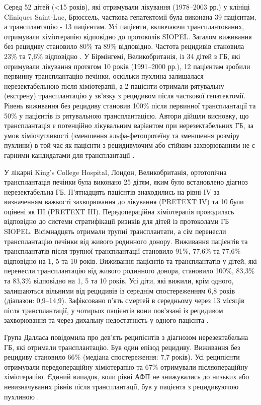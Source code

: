 Серед 52 дітей (<15 років), які отримували лікування (1978–2003 рр.) у клініці Cliniques Saint-Luc, Брюссель, часткова гепатектомії була виконана 39 пацієнтам, а трансплантацію - 13 пацієнтам. Усі пацієнти, включаючи трансплантованих, отримували хіміотерапію відповідно до протоколів SIOPEL. Загалом виживання без рецидиву становило 80\% та 89\% відповідно. Частота рецидивів становила 23\% та 7,6\% відповідно \cite{pmid20406943}.
У Бірмінгемі, Великобританія, із 34 дітей з ГБ, які отримували лікування протягом 10 років (1991–2000 рр.), 12 пацієнтам зробили первинну трансплантацію печінки, оскільки пухлина залишалася нерезектабельною після хіміотерапії, а 2 пацієнти отримали рятувальну (екстрену) трансплантацію у зв’язку з  рецидивом після часткової гепатектомії. Рівень виживання без рецидиву становив 100\% після первинної трансплантації та 50\% у пацієнтів із рятувальною трансплантацією. Автори дійшли висновку, що трансплантація є потенційно лікувальним варіантом при нерезектабельних ГБ, за умов хіміочутливості (зменшення альфа-фетопротеїну та зменшення розміру пухлини) в той час як пацієнти з рецидивуючим або стійким захворюванням не є гарними кандидатами для трансплантації \cite{pmid20070564}.

У лікарні King’s College Hospital, Лондон, Великобританія, ортотопічна трансплантація печінки була виконано 25 дітям, яким було встановлено діагноз нерезектабельна ГБ. П'ятнадцять пацієнтів знаходились на рівні IV за визначенням важкості захворювання до лікування (PRETEXT IV) та 10 були оцінені як III (PRETEXT III). Передопераційна хіміотерапія проводилась відповідно до системи стратифікації ризиків для дітей із протоколами ГБ SIOPEL. Вісімнадцять отримали трупні трансплантати, а сім перенесли трансплантацію печінки від живого родинного донору. Виживання пацієнтів та трансплантатів після трупної трансплантації становило 91\%, 77,6\% та 77,6\% відповідно на 1, 5 та 10 років. Виживання пацієнтів та трансплантатів у дітей, які перенесли трансплантацію від живого родинного донора, становило 100\%, 83,3\% та 83,3\% відповідно на 1, 5 та 10 років. Усі діти, які вижили, крім одного, залишаються вільними від рецидивів із середнім спостереженням 6,8 років (діапазон: 0,9–14,9).
Зафіксовано п’ять смертей в середньому через 13 місяців після трансплантації, у чотирьох пацієнтів вони пов’язані із рецидивом захворювання та через дихальну недостатність у одного пацієнта \cite{pmid16794509}.

Група Далласа повідомила про дев'ять реципієнтів з діагнозом нерезектабельна ГБ, які отримали трансплантацію. Був один епізод рецидиву. Виживання без рецидиву становило 66\% (медіана спостереження: 7,7 років). Усі реципієнти отримували передопераційну хіміотерапію та 67\% отримували післяопераційну хіміотерапію. Єдиний випадок, коли рівні АФП не знижувались до низьких або невизначуваних рівнів після трансплантації, був у пацієнта з рецидивуючою пухлиною \cite{pmid10839879}.

